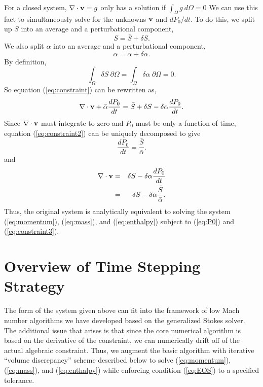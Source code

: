 \documentclass[final]{siamltex}
\def\vb {{\bf v}}
\begin{document}
For a closed system, $\nabla \cdot \vb = g$ only has a solution if $\int_\Omega g~d\Omega = 0$
We can use this fact to simultaneously solve for the unknowns
$\vb$ and $dP_0/dt$.
To do this, we split up $S$ into an average and a perturbational component,
\begin{equation}
S = \bar{S} + \delta S.
\end{equation}
We also
split $\alpha$ into an average and a perturbational component,
\begin{equation}
\alpha = \bar{\alpha} + \delta\alpha.
\end{equation}
By definition,
\begin{equation}
\int_{\Omega} \delta S ~\partial\Omega = \int_{\Omega} \delta \alpha ~\partial\Omega = 0.\label{eq:zero int}
\end{equation}
So equation (\ref{eq:constraint}) can be rewritten as,
\begin{equation}
\nabla\cdot\vb + \bar{\alpha}\frac{d P_0}{d t} 
= \bar{S} + \delta S -
\delta\alpha\frac{d P_0}{d t}.\label{eq:constraint2}
\end{equation}
Since $\nabla \cdot \vb$ must integrate to zero and $P_0$ must be only a function of time,
equation (\ref{eq:constraint2}) can be uniquely decomposed to give
\begin{equation}
\frac{dP_0}{dt} = \frac{\bar{S}}{\bar{\alpha}}.\label{eq:P0}
\end{equation}
and
\begin{eqnarray}
\nabla\cdot\vb &=& \delta S - \delta\alpha\frac{dP_0}{dt} \nonumber\\
&=& \delta S - \delta\alpha\frac{\bar{S}}{\bar{\alpha}}.\label{eq:constraint3}
\end{eqnarray}
Thus, the original system is analytically equivalent to solving the system (\ref{eq:momentum}), (\ref{eq:mass}), and (\ref{eq:enthalpy})
subject to (\ref{eq:P0}) and (\ref{eq:constraint3}).

\section{Overview of Time Stepping Strategy}

The form of the system given above can fit into the framework of low Mach number algorithms we have
developed based on the generalized Stokes solver. 
The additional issue that arises is that since the core numerical algorithm is based on the derivative
of the constraint, we can numerically drift off of the actual algebraic constraint. Thus, we augment the
basic algorithm with iterative 
``volume discrepancy'' scheme described below to solve 
(\ref{eq:momentum}), (\ref{eq:mass}), and (\ref{eq:enthalpy})
while enforcing condition (\ref{eq:EOS}) to a specified tolerance.\\
\end{document}
